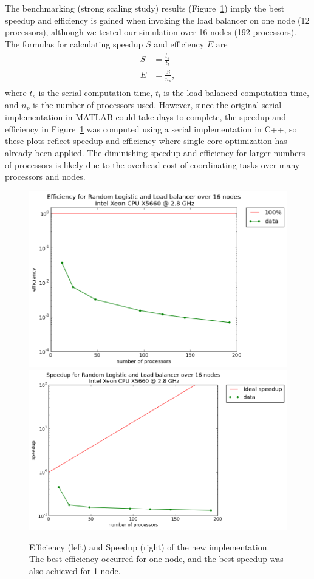 The benchmarking (strong scaling study) results (Figure~\ref{fig:effsp}) imply
the best speedup and efficiency is gained when invoking the load balancer on
one node (12 processors), although we tested our simulation over 16 nodes
(192 processors). The formulas for calculating speedup $S$ and
efficiency $E$ are
\begin{align}
\begin{split}
S &= \frac{t_s}{t_l}\\
E &= \frac{S}{n_p},
\end{split}
\end{align}
where $t_s$ is the serial computation time, $t_l$ is the load balanced
computation time, and $n_p$ is the number of processors used. However,
since the original serial implementation in MATLAB could take days to complete,
the speedup and efficiency in Figure~\ref{fig:effsp} was computed using a
serial implementation in C++, so these plots reflect speedup and
efficiency where single core optimization has already been applied. The
diminishing speedup and efficiency for larger numbers of processors is
likely due to the overhead cost of coordinating tasks over many
processors and nodes. 
\begin{figure}[!h]
\caption[Impact of the load balancing tool: efficiency and
speedup]{Efficiency (left) and Speedup (right) of the new
  implementation. The best efficiency occurred for one node, and the best speedup was also achieved for 1 node.}\label{fig:effsp}
\centering
\includegraphics[width=.5\textwidth]{figs/efficiency_random_logistic.png}\hfill
\includegraphics[width=.5\textwidth]{figs/speedup_random_logistic.png}
\end{figure}